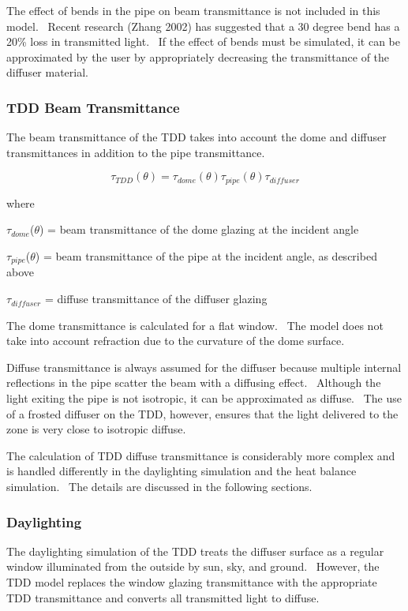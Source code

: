 The effect of bends in the pipe on beam transmittance is not included in this model.~ Recent research (Zhang 2002) has suggested that a 30 degree bend has a 20\% loss in transmitted light.~ If the effect of bends must be simulated, it can be approximated by the user by appropriately decreasing the transmittance of the diffuser material.

\subsubsection{TDD Beam Transmittance}\label{tdd-beam-transmittance}

The beam transmittance of the TDD takes into account the dome and diffuser transmittances in addition to the pipe transmittance.

\begin{equation}
{\tau_{TDD}}(\theta ) = {\tau_{dome}}(\theta ){\tau_{pipe}}(\theta ){\tau_{diffuser}}
\end{equation}

where

\(\tau_{dome}\)(\(\theta\)) = beam transmittance of the dome glazing at the incident angle

\(\tau_{pipe}\)(\(\theta\)) = beam transmittance of the pipe at the incident angle, as described above

\(\tau_{diffuser}\) = diffuse transmittance of the diffuser glazing

The dome transmittance is calculated for a flat window.~ The model does not take into account refraction due to the curvature of the dome surface.

Diffuse transmittance is always assumed for the diffuser because multiple internal reflections in the pipe scatter the beam with a diffusing effect.~ Although the light exiting the pipe is not isotropic, it can be approximated as diffuse.~ The use of a frosted diffuser on the TDD, however, ensures that the light delivered to the zone is very close to isotropic diffuse.

The calculation of TDD diffuse transmittance is considerably more complex and is handled differently in the daylighting simulation and the heat balance simulation.~ The details are discussed in the following sections.

\subsubsection{Daylighting}\label{daylighting}

The daylighting simulation of the TDD treats the diffuser surface as a regular window illuminated from the outside by sun, sky, and ground.~ However, the TDD model replaces the window glazing transmittance with the appropriate TDD transmittance and converts all transmitted light to diffuse.

